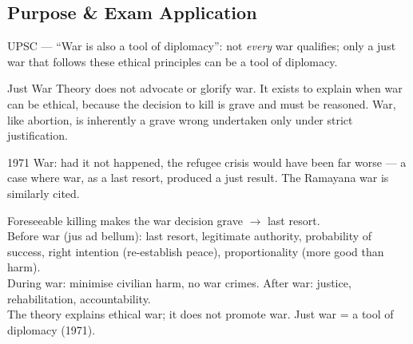 \subsection{Purpose \& Exam Application}
\begin{PYQLink}
UPSC --- ``War is also a tool of diplomacy'': not \emph{every} war qualifies; only a just war that follows these ethical principles can be a tool of diplomacy.
\end{PYQLink}

\begin{CriticalPoint}
Just War Theory does not advocate or glorify war. It exists to explain when war can be ethical, because the decision to kill is grave and must be reasoned. War, like abortion, is inherently a grave wrong undertaken only under strict justification.
\end{CriticalPoint}

\begin{ExampleBox}
1971 War: had it not happened, the refugee crisis would have been far worse --- a case where war, as a last resort, produced a just result. The Ramayana war is similarly cited.
\end{ExampleBox}

\begin{QuickRevision}
Foreseeable killing makes the war decision grave $\rightarrow$ last resort.\\
Before war (jus ad bellum): last resort, legitimate authority, probability of success, right intention (re-establish peace), proportionality (more good than harm).\\
During war: minimise civilian harm, no war crimes. After war: justice, rehabilitation, accountability.\\
The theory explains ethical war; it does not promote war. Just war = a tool of diplomacy (1971).
\end{QuickRevision}
